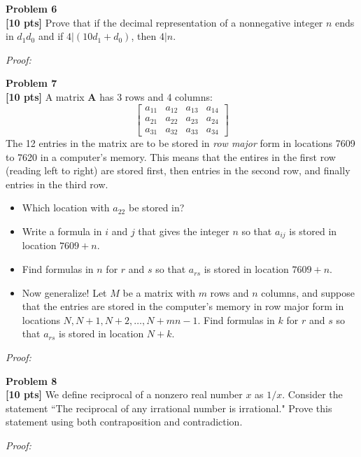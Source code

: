 \documentclass{article}
\newenvironment{problem}[2][Problem]
    { \begin{mdframed}[backgroundcolor=gray!20] \textbf{#1 #2} \\}
    {  \end{mdframed}}
\newenvironment{solution}
    {\textit{Proof:}}
    {}
\begin{document}
\begin{problem}{6}
\textbf{[10 pts]} Prove that if the decimal representation of a nonnegative integer $n$ ends in $d_1 d_0$ and if $4 | (10d_1 + d_0)$, then $4|n$.
\end{problem}
\begin{solution}
\end{solution}

\begin{problem}{7}
\textbf{[10 pts]} A matrix $\textbf{A}$ has 3 rows and 4 columns:
\[
    \begin{bmatrix} 
        a_{11} & a_{12} & a_{13} & a_{14} \\
        a_{21} & a_{22} & a_{23} & a_{24} \\
        a_{31} & a_{32} & a_{33} & a_{34} 
    \end{bmatrix}
\]
The 12 entries in the matrix are to be stored in \textit{row major} form in locations 7609 to 7620 in a computer's memory. This means that the entires in the first row (reading left to right) are stored first, then entries in the second row, and finally entries in the third row.
\begin{itemize}
    \item Which location with $a_{22}$ be stored in?
    \item Write a formula in $i$ and $j$ that gives the integer $n$ so that $a_{ij}$ is stored in location $7609 + n$. 
    \item Find formulas in $n$ for $r$ and $s$ so that $a_{rs}$ is stored in location $7609 + n$.
    \item Now generalize! Let $M$ be a matrix with $m$ rows and $n$ columns, and suppose that the entries are stored in the computer's memory in row major form in locations $N, N+1, N+2, \ldots, N+mn-1$. Find formulas in $k$ for $r$ and $s$ so that $a_{rs}$ is stored in location $N+k$.
\end{itemize}
\end{problem}

\begin{solution}
\end{solution}

\newpage
\begin{problem}{8}
\textbf{[10 pts]} We define reciprocal of a nonzero real number $x$ as $1/x$. Consider the statement ``The reciprocal of any irrational number is irrational."  Prove this statement using both contraposition and contradiction.
\end{problem}
\begin{solution}
\end{solution}
\end{document}
